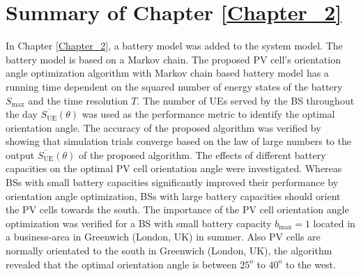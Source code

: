 \section{Summary of Chapter \ref{Chapter_2}\label{sum_Chapter_2}}

In Chapter \ref{Chapter_2}, a battery model was added to the system model. The battery model is based on a Markov chain. The proposed PV cell's orientation angle optimization algorithm with Markov chain based battery model has a running time dependent on the squared number of energy states of the battery $S_{\max}$ and the time resolution $T$. The number of UEs served by the BS throughout the day $\overline{S_{\mathrm{UE}}}(\theta)$ was used as the performance metric to identify the optimal orientation angle. The accuracy of the proposed algorithm was verified by showing that simulation trials converge based on the law of large numbers to the output $\overline{S_{\mathrm{UE}}}(\theta)$ of the proposed algorithm. 
The effects of different battery capacities on the optimal PV cell orientation angle were investigated. 
Whereas BSs with small battery capacities significantly improved their performance by orientation angle optimization, BSs with large battery capacities should orient the PV cells towards the south. The importance of the PV cell orientation angle optimization was verified for a BS with small battery capacity $b_{\max}=1$ located in a business-area in Greenwich (London, UK) in summer. Also PV cells are normally orientated to the south in Greenwich (London, UK), the algorithm revealed that the optimal orientation angle is between $25^{\mathrm{o}}$ to $40 ^{\mathrm{o}}$ to the west. 




